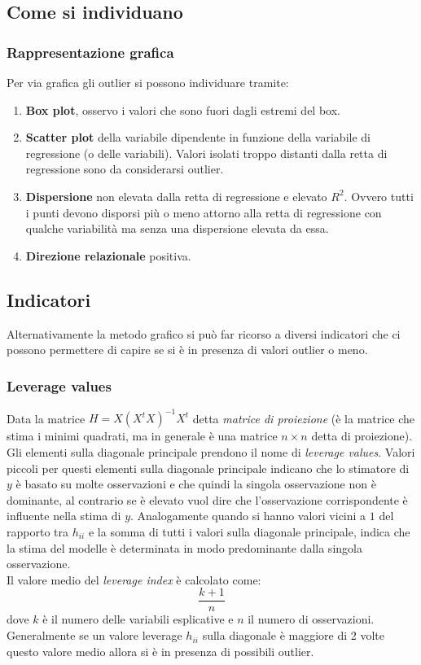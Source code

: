 \subsection{Come si individuano}
\subsubsection{Rappresentazione grafica}
Per via grafica gli outlier si possono individuare tramite:
\begin{enumerate}
	\item \textbf{Box plot}, osservo i valori che sono fuori dagli estremi del box.
	\item \textbf{Scatter plot} della variabile dipendente in funzione della variabile di regressione (o delle variabili). Valori isolati troppo distanti dalla retta di regressione sono da considerarsi outlier.
	\item \textbf{Dispersione} non elevata dalla retta di regressione e elevato $R^2$. Ovvero tutti i punti devono disporsi più o meno attorno alla retta di regressione con qualche variabilità ma senza una dispersione elevata da essa. 
	\item \textbf{Direzione relazionale} positiva.
\end{enumerate}

\subsection{Indicatori}
Alternativamente la metodo grafico si può far ricorso a diversi indicatori che ci possono permettere di capire se si è in presenza di valori outlier o meno.

\subsubsection{Leverage values}
Data la matrice $H = X(X^t X)^{-1} X^t$ detta \textit{matrice di proiezione} (è la matrice che stima i minimi quadrati, ma in generale è una matrice $n \times n$ detta di proiezione). Gli elementi sulla diagonale principale prendono il nome di \textit{leverage values}. Valori piccoli per questi elementi sulla diagonale principale indicano che lo stimatore di $y$ è basato su molte osservazioni e che quindi la singola osservazione non è dominante, al contrario se è elevato vuol dire che l'osservazione corrispondente è influente nella stima di $y$. Analogamente quando si hanno valori vicini a $1$ del rapporto tra $h_{ii}$ e la somma di tutti i valori sulla diagonale principale, indica che la stima del modelle è determinata in modo predominante dalla singola osservazione. \\
Il valore medio del \textit{leverage index} è calcolato come:
\begin{equation}
\frac{k+1}{n}
\end{equation}
dove $k$ è il numero delle variabili esplicative e $n$ il numero di osservazioni. Generalmente se un valore leverage $h_{ii}$ sulla diagonale è maggiore di 2 volte questo valore medio allora si è in presenza di possibili outlier.

